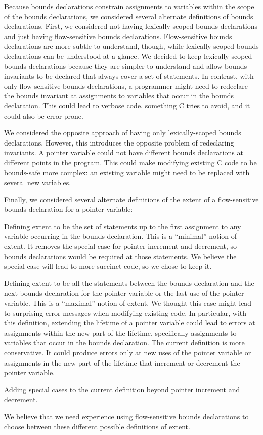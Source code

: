 Because bounds declarations constrain assignments to variables within the scope
of the bounds declarations, we considered several alternate definitions of 
bounds declarations.   First, we considered not having lexically-scoped bounds
declarations and just having flow-sensitive bounds declarations.  Flow-sensitive
bounds declarations are more subtle to understand, though, while lexically-scoped
bounds declarations can be understood at a glance.  We decided to keep
lexically-scoped bounds declarations because they are simpler to understand and
allow bounds invariants to be declared that always cover a set of statements.
In contrast, with only flow-sensitive bounds declarations, a programmer might need 
to redeclare the bounds invariant at  assignments to variables that occur in the
bounds declaration. This could lead to verbose code, something C tries to
avoid, and it could also be error-prone.

We considered the opposite approach of having only lexically-scoped
bounds declarations.   However, this introduces the opposite problem of
redeclaring invariants.  A pointer variable could not have different
bounds declarations at different points in the program.  This could
make modifying existing C code to be bounds-safe more complex: an existing
variable might need to be replaced with several new variables.

Finally, we considered several alternate definitions of the extent of a
flow-sensitive bounds declaration for a pointer variable:
\begin{compactitem}
    \item Defining extent to be the set of statements up to the first assignment
          to any variable occurring in the bounds declaration.   This is a
          ``minimal'' notion of extent.  It removes the special case for
          pointer increment and decrement, so bounds
          declarations would be required at those statements.  We believe
          the special case will lead to more succinct code, so we chose to
          keep it.
    \item Defining extent to be all the statements between the bounds
          declaration and the next bounds declaration for
         the pointer variable or the last use of the pointer variable.  This
         is a ``maximal'' notion of extent.  We thought this case might
         lead to surprising error messages when modifying existing
         code.  In particular, with this definition, extending
         the lifetime of a pointer variable could lead to errors
         at assignments within the new part of the lifetime, specifically
         assignments to variables that occur in the bounds declaration.
         The current definition is more conservative.  It could produce errors
         only at new uses of the pointer variable or assignments in
         the new part of the lifetime that increment or decrement the pointer 
         variable.
  \item Adding special cases to the current definition beyond
        pointer increment and decrement.  
\end{compactitem}
We believe that we need experience using flow-sensitive bounds declarations
to choose between these different possible definitions of extent.

